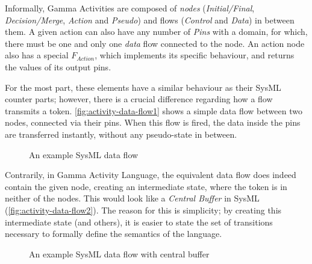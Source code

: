 \begin{definition}
Informally, Gamma Activities are composed of \emph{nodes} (\emph{Initial/Final}, \emph{Decision/Merge}, \emph{Action} and \emph{Pseudo}) and flows (\emph{Control} and \emph{Data}) in between them. A given action can also have any number of \emph{Pins} with a domain, for which, there must be one and only one \emph{data} flow connected to the node. An action node also has a special \(F_{Action}\), which implements its specific behaviour, and returns the values of its output pins.

For the most part, these elements have a similar behaviour as their SysML counter parts; however, there is a crucial difference regarding how a flow transmits a token. \autoref{fig:activity-data-flow1} shows a simple data flow between two nodes, connected via their pins. When this flow is fired, the data inside the pins are transferred instantly, without any pseudo-state in between. 

\begin{figure}[!ht]
	\centering
	
	\caption{An example SysML data flow}
	\label{fig:activity-data-flow1}
\end{figure}

Contrarily, in Gamma Activity Language, the equivalent data flow does indeed contain the given node, creating an intermediate state, where the token is in neither of the nodes. This would look like a \emph{Central Buffer} in SysML (\autoref{fig:activity-data-flow2}). The reason for this is simplicity; by creating this intermediate state (and others), it is easier to state the set of transitions necessary to formally define the semantics of the language.

\begin{figure}[!ht]
	\centering
	
	\caption{An example SysML data flow with central buffer}
	\label{fig:activity-data-flow2}
\end{figure}
	
\end{definition}\label{def:activity-structure}

